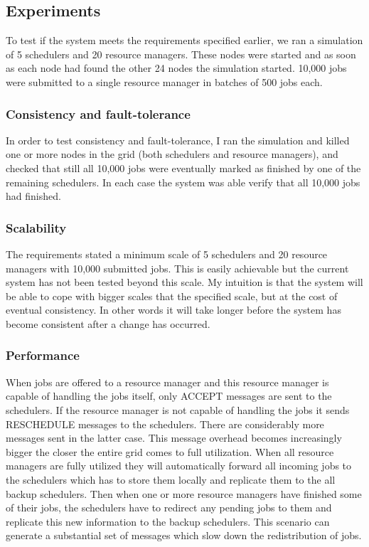 \documentclass{article}
\begin{document}
\subsection{Experiments}

To test if the system meets the requirements specified earlier, we ran a simulation of 5 schedulers and 20 resource managers. These nodes were started and as soon as each node had found the other 24 nodes the simulation started. 10,000 jobs were submitted to a single resource manager in batches of 500 jobs each.

\subsubsection{Consistency and fault-tolerance}
In order to test consistency and fault-tolerance, I ran the simulation and killed one or more nodes in the grid (both schedulers and resource managers), and checked that still all 10,000 jobs were eventually marked as finished by one of the remaining schedulers. In each case the system was able verify that all 10,000 jobs had finished.

\subsubsection{Scalability}
The requirements stated a minimum scale of 5 schedulers and 20 resource managers with 10,000 submitted jobs. This is easily achievable but the current system has not been tested beyond this scale. My intuition is that the system will be able to cope with bigger scales that the specified scale, but at the cost of eventual consistency. In other words it will take longer before the system has become consistent after a change has occurred.

\subsubsection{Performance}
When jobs are offered to a resource manager and this resource manager is capable of handling the jobs itself, only ACCEPT messages are sent to the schedulers. If the resource manager is not capable of handling the jobs it sends RESCHEDULE messages to the schedulers. There are considerably more messages sent in the latter case. This message overhead becomes increasingly bigger the closer the entire grid comes to full utilization. When all resource managers are fully utilized they will automatically forward all incoming jobs to the schedulers which has to store them locally and replicate them to the all backup schedulers. Then when one or more resource managers have finished some of their jobs, the schedulers have to redirect any pending jobs to them and replicate this new information to the backup schedulers. This scenario can generate a substantial set of messages which slow down the redistribution of jobs.
\end{document}
